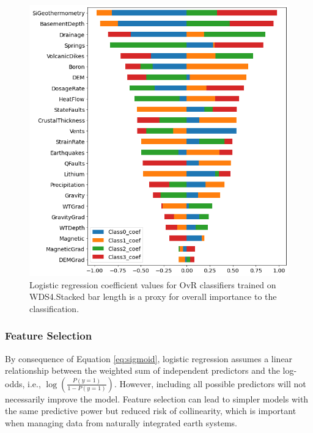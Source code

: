 \begin{figure}[!htp]
\centering
\includegraphics[width=\textwidth]{templates/images/Figure-LR-coefficients.png}
\singlespacing
\caption[Logistic regression feature coefficients]{Logistic regression coefficient values for OvR classifiers trained on WDS4.Stacked bar length is a proxy for overall importance to the classification.}
\label{fig:logreg_coefs}
\end{figure}

\subsubsection{Feature Selection} \label{ch5:logreg_rfe}
By consequence of Equation \ref{eq:sigmoid}, logistic regression assumes a linear relationship between the weighted sum of independent predictors and the log-odds, i.e., $\log(\frac{P(y=1)}{1-P(y=1)})$. However, including all possible predictors will not necessarily improve the model. Feature selection can lead to simpler models with the same predictive power but reduced risk of collinearity, which is important when managing data from naturally integrated earth systems. 

